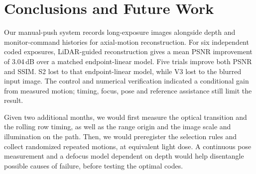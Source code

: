 \section{Conclusions and Future Work}
Our manual-push system records long-exposure images alongside depth and monitor-command histories for axial-motion reconstruction. For six independent coded exposures, LiDAR-guided reconstruction gives a mean PSNR improvement of 3.04\,dB over a matched endpoint-linear model. Five trials improve both PSNR and SSIM. S2 lost to that endpoint-linear model, while V3 lost to the blurred input image. The control and numerical verification indicated a conditional gain from measured motion; timing, focus, pose and reference assistance still limit the result.

Given two additional months, we would first measure the optical transition and the rolling row timing, as well as the range origin and the image scale and illumination on the path. Then, we would preregister the selection rules and collect randomized repeated motions, at equivalent light dose. A continuous pose measurement and a defocus model dependent on depth would help disentangle possible causes of failure, before testing the optimal codes.
